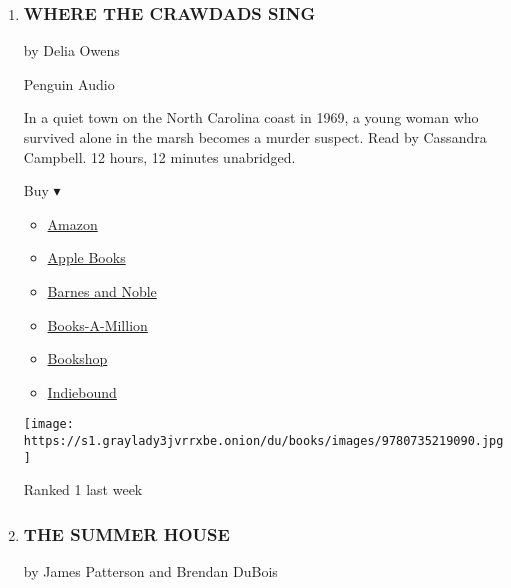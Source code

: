 \begin{enumerate}
\def\labelenumi{\arabic{enumi}.}
\item
  \hypertarget{where-the-crawdads-sing}{%
  \subsubsection{WHERE THE CRAWDADS
  SING}\label{where-the-crawdads-sing}}

  by Delia Owens

  Penguin Audio

  In a quiet town on the North Carolina coast in 1969, a young woman who
  survived alone in the marsh becomes a murder suspect. Read by
  Cassandra Campbell. 12 hours, 12 minutes unabridged.

  Buy ▾

  \begin{itemize}
  \tightlist
  \item
    \href{https://www.amazon.com/Where-Crawdads-Sing-Delia-Owens/dp/0735219095?tag=NYTBS-20}{Amazon}
  \item
    \href{https://du-gae-books-dot-nyt-du-prd.appspot.com/buy?title=WHERE+THE+CRAWDADS+SING\&author=Delia+Owens}{Apple
    Books}
  \item
    \href{https://www.anrdoezrs.net/click-7990613-11819508?url=https\%3A\%2F\%2Fwww.barnesandnoble.com\%2Fw\%2F\%3Fean\%3D9780525640370}{Barnes
    and Noble}
  \item
    \href{https://www.anrdoezrs.net/click-7990613-35140?url=https\%3A\%2F\%2Fwww.booksamillion.com\%2Fp\%2FWHERE\%2BTHE\%2BCRAWDADS\%2BSING\%2FDelia\%2BOwens\%2F9780525640370}{Books-A-Million}
  \item
    \href{https://bookshop.org/a/3546/9780525640370}{Bookshop}
  \item
    \href{https://www.indiebound.org/book/9780525640370?aff=NYT}{Indiebound}
  \end{itemize}

  \texttt{[image: https://s1.graylady3jvrrxbe.onion/du/books/images/9780735219090.jpg]}

  Ranked 1 last week
\item
  \hypertarget{the-summer-house}{%
  \subsubsection{THE SUMMER HOUSE}\label{the-summer-house}}

  by James Patterson and Brendan DuBois


\end{enumerate}
